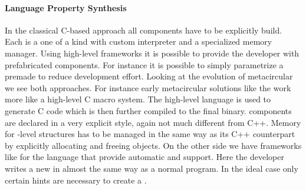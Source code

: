 \paragraph{Language Property Synthesis}
In the classical C-based \VM approach all \VM components have to be explicitly build.
Each \VM is a one of a kind with custom interpreter and a specialized memory manager.
Using high-level \VM frameworks it is possible to provide the \VM developer with prefabricated components.
For instance it is possible to simply parametrize a premade \GC to reduce development effort.
Looking at the evolution of metacircular \VMs we see both approaches.
For instance early metacircular solutions like the \Squeak \VM \cite{Inga97a} work more like a high-level C macro system.
The high-level language is used to generate C code which is then further compiled to the final \VM binary.
\VM components are declared in a very explicit style, again not much different from C++.
Memory for \VM-level structures has to be managed in the same way as its C++ counterpart by explicitly allocating and freeing objects.
On the other side we have \VM frameworks like \PyPy for the \Python language that provide automatic \GC and \JIT support.
Here the developer writes a new \VM in almost the same way as a normal \Python program.
In the ideal case only certain hints are necessary to create a \JIT.


